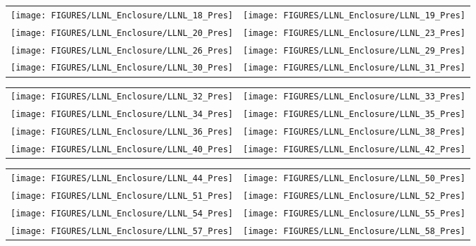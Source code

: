 \begin{figure}[p]
\begin{tabular*}{\textwidth}{l@{\extracolsep{\fill}}r}
\texttt{[image: FIGURES/LLNL\_Enclosure/LLNL\_18\_Pres]} &
\texttt{[image: FIGURES/LLNL\_Enclosure/LLNL\_19\_Pres]} \\
\texttt{[image: FIGURES/LLNL\_Enclosure/LLNL\_20\_Pres]} &
\texttt{[image: FIGURES/LLNL\_Enclosure/LLNL\_23\_Pres]} \\
\texttt{[image: FIGURES/LLNL\_Enclosure/LLNL\_26\_Pres]} &
\texttt{[image: FIGURES/LLNL\_Enclosure/LLNL\_29\_Pres]} \\
\texttt{[image: FIGURES/LLNL\_Enclosure/LLNL\_30\_Pres]} &
\texttt{[image: FIGURES/LLNL\_Enclosure/LLNL\_31\_Pres]}
\end{tabular*}
\label{LLNL_Enclosure_Pres_3}
\end{figure}

\begin{figure}[p]
\begin{tabular*}{\textwidth}{l@{\extracolsep{\fill}}r}
\texttt{[image: FIGURES/LLNL\_Enclosure/LLNL\_32\_Pres]} &
\texttt{[image: FIGURES/LLNL\_Enclosure/LLNL\_33\_Pres]} \\
\texttt{[image: FIGURES/LLNL\_Enclosure/LLNL\_34\_Pres]} &
\texttt{[image: FIGURES/LLNL\_Enclosure/LLNL\_35\_Pres]} \\
\texttt{[image: FIGURES/LLNL\_Enclosure/LLNL\_36\_Pres]} &
\texttt{[image: FIGURES/LLNL\_Enclosure/LLNL\_38\_Pres]} \\
\texttt{[image: FIGURES/LLNL\_Enclosure/LLNL\_40\_Pres]} &
\texttt{[image: FIGURES/LLNL\_Enclosure/LLNL\_42\_Pres]}
\end{tabular*}
\label{LLNL_Enclosure_Pres_4}
\end{figure}

\begin{figure}[p]
\begin{tabular*}{\textwidth}{l@{\extracolsep{\fill}}r}
\texttt{[image: FIGURES/LLNL\_Enclosure/LLNL\_44\_Pres]} &
\texttt{[image: FIGURES/LLNL\_Enclosure/LLNL\_50\_Pres]} \\
\texttt{[image: FIGURES/LLNL\_Enclosure/LLNL\_51\_Pres]} &
\texttt{[image: FIGURES/LLNL\_Enclosure/LLNL\_52\_Pres]} \\
\texttt{[image: FIGURES/LLNL\_Enclosure/LLNL\_54\_Pres]} &
\texttt{[image: FIGURES/LLNL\_Enclosure/LLNL\_55\_Pres]} \\
\texttt{[image: FIGURES/LLNL\_Enclosure/LLNL\_57\_Pres]} &
\texttt{[image: FIGURES/LLNL\_Enclosure/LLNL\_58\_Pres]}
\end{tabular*}
\label{LLNL_Enclosure_Pres_5}
\end{figure}

